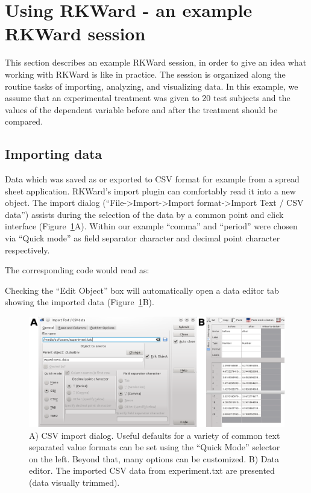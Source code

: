 \section{Using RKWard - an example RKWard session}
\label{sec:using_RKWard}
This section describes an example RKWard session, in order to give an idea
what working with RKWard is like in practice.
The session is organized along the routine tasks of importing,
analyzing, and visualizing data. In this example, we assume that an experimental
treatment was given to 20 test subjects and the values of the dependent
variable before and after the treatment should be compared. 

\subsection{Importing data}
\label{sec:importing_data}
Data which was saved as or exported to CSV format for example from a
spread sheet application. RKWard's import plugin can
comfortably read it into a new  object.
The import dialog (``File->Import->Import
format->Import Text / CSV data'') assists during the
selection of the data by a common point and click interface (Figure~\ref{fig:import_data}A). Within our
example ``comma'' and ``period'' were chosen via ``Quick mode'' as field
separator character and decimal point character respectively.

The corresponding  code would read as:



Checking the ``Edit Object'' box will automatically open a data editor tab
showing the imported data (Figure~\ref{fig:import_data}B).

\begin{figure}[htp]
 \centering
 \includegraphics[width=15.5cm]{../figures/import_data.png}
 \caption{A) CSV import dialog. Useful defaults for a variety of common text separated value formats can
  be set using the ``Quick Mode'' selector on the left. Beyond that, many options can be customized. B) Data editor. The imported CSV
  data from experiment.txt are presented (data visually trimmed).}
 \label{fig:import_data}
\end{figure}

